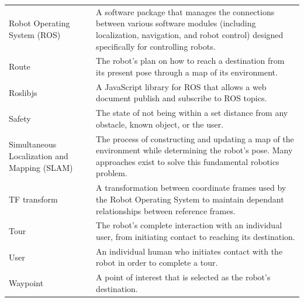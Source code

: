 \documentclass[11pt]{report}
\begin{document}
\begin{longtable}{p{3cm}p{9.9cm}}
Robot Operating System (ROS)&A software package that manages the connections between various software modules (including localization, navigation, and robot control) designed specifically for controlling robots.\\
Route&The robot's plan on how to reach a destination from its present pose through a map of its environment.\\
Roslibjs&A JavaScript library for ROS that allows a web document publish and subscribe to ROS topics.\\
Safety&The state of not being within a set distance from any obstacle, known object, or the user.\\
Simultaneous Localization and Mapping (SLAM)&The process of constructing and updating a map of the environment while determining the robot's pose. Many approaches exist to solve this fundamental robotics problem.\\
TF transform&A transformation between coordinate frames used by the Robot Operating System to maintain dependant relationships between reference frames.\\
Tour&The robot's complete interaction with an individual user, from initiating contact to reaching its destination.\\
User&An individual human who initiates contact with the robot in order to complete a tour.\\
Waypoint&A point of interest that is selected as the robot's destination.
\end{longtable}


\end{document}
